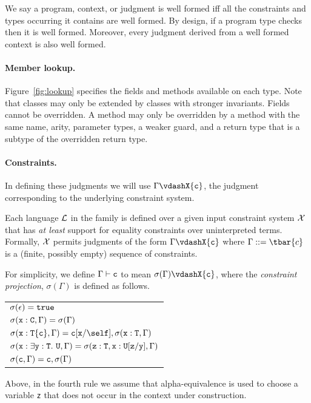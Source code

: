 We say a program, context, or judgment is well formed iff all the constraints and types occurring it contains are well formed. By design, if a program type checks then it is well formed. Moreover, every judgment derived from a well formed context is also well formed.

\paragraph{Member lookup.} Figure~\ref{fig:lookup} specifies the fields and methods available on each type. Note that classes may only be extended by classes with stronger invariants. Fields cannot be overridden.
A method may only be overridden by a method with the same name, arity, parameter types, a weaker guard, and a return type that is a subtype of the overridden return type.


\paragraph{Constraints.}
In defining these judgments we will use \mbox{$\Gamma \vdashX {\tt c}$},
the judgment corresponding to the underlying constraint system.

Each language $\cal L$ in the family is defined over a given input
constraint system $\cal X$ that has {\em at least} support for equality constraints over uninterpreted terms.
Formally, $\cal X$ permits judgments of the form
$\Gamma \vdashX {\tt c}$ where $\Gamma::=\tbar{c}$ is a (finite, possibly empty) sequence of constraints.

For
simplicity, we define $\Gamma \vdash {\tt c}$ to mean
$\sigma(\Gamma)\vdashX {\tt c}$, where the {\em constraint
projection}, $\sigma(\Gamma)$ is defined as follows. 
%
\begin{center}
\begin{tabular}{l}
$\sigma(\epsilon)={\tt true}$\\
$\sigma({\tt x}:{\tt C}, \Gamma)=\sigma(\Gamma)$\\
$\sigma({\tt x}:{\tt T\{c\}}, \Gamma)={\tt c}[{\tt x}/\self], \sigma({\tt x}:{\tt T},\Gamma)$\\
$\sigma({\tt x}:\exists {\tt y}:{\tt T}.~{\tt U}, \Gamma)=\sigma({\tt z:T}, {\tt x}:{\tt U[{\tt z}/{\tt y}]},\Gamma)$\\
$\sigma({\tt c},\Gamma) = {\tt c}, \sigma(\Gamma)$
\end{tabular}
\end{center}
%
Above, in the fourth rule we assume that alpha-equivalence is used to
choose a variable {\tt z} that does not
occur in the context under construction.

